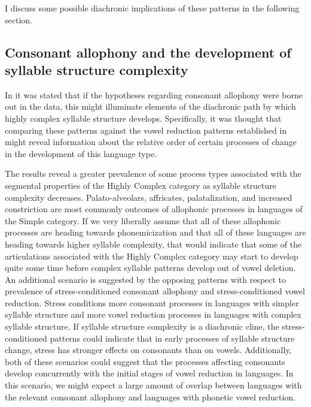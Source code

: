   I discuss some possible diachronic implications of these patterns in the following section.

\subsection{Consonant allophony and the development of syllable structure complexity} \label{sec:7.4.1}

  In  it was stated that if the hypotheses regarding consonant allophony were borne out in the data, this might illuminate elements of the diachronic path by which highly complex syllable structure develops. Specifically, it was thought that comparing these patterns against the vowel reduction patterns established in  might reveal information about the relative order of certain processes of change in the development of this language type.

  The results reveal a greater prevalence of some process types associated with the segmental properties of the Highly Complex category as syllable structure complexity decreases. Palato-alveolars, affricates, palatalization, and increased constriction are most commonly outcomes of allophonic processes in languages of the Simple category. If we very liberally assume that all of these allophonic processes are heading towards phonemicization and that all of these languages are heading towards higher syllable complexity, that would indicate that some of the articulations associated with the Highly Complex category may start to develop quite some time before complex syllable patterns develop out of vowel deletion. An additional scenario is suggested by the opposing patterns with respect to prevalence of stress-conditioned consonant allophony and stress-conditioned vowel reduction. Stress conditions more consonant processes in languages with simpler syllable structure and more vowel reduction processes in languages with complex syllable structure. If syllable structure complexity is a diachronic cline, the stress-conditioned patterns could indicate that in early processes of syllable structure change, stress has stronger effects on consonants than on vowels. Additionally, both of these scenarios could suggest that the processes affecting consonants develop concurrently with the initial stages of vowel reduction in languages. In this scenario, we might expect a large amount of overlap between languages with the relevant consonant allophony and languages with phonetic vowel reduction.

